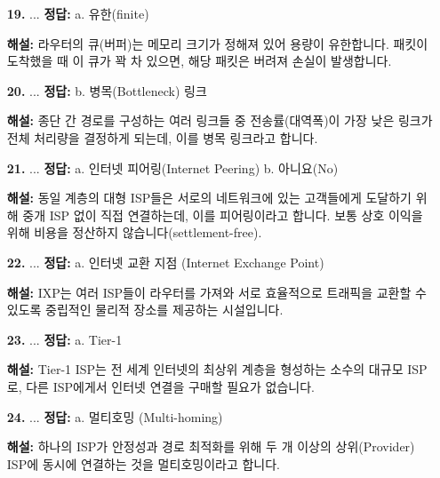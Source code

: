 \documentclass[a4paper, 10pt]{article}
\newcommand{\sectionbox}[1]{
  \vspace{0.5em}
  \noindent\fbox{\textbf{#1}}
  \vspace{0.5em}
}
\begin{document}
\begin{enumerate}[itemsep=2.5em, leftmargin=2em, label={}]
\item[\textbf{19.}] ...
\vspace{0.5em}
\noindent\textbf{정답:} a. 유한(finite) \par
\small\textbf{해설:} 라우터의 큐(버퍼)는 메모리 크기가 정해져 있어 용량이 유한합니다. 패킷이 도착했을 때 이 큐가 꽉 차 있으면, 해당 패킷은 버려져 손실이 발생합니다.

\item[\textbf{20.}] ...
\vspace{0.5em}
\noindent\textbf{정답:} b. 병목(Bottleneck) 링크 \par
\small\textbf{해설:} 종단 간 경로를 구성하는 여러 링크들 중 전송률(대역폭)이 가장 낮은 링크가 전체 처리량을 결정하게 되는데, 이를 병목 링크라고 합니다.

\item[] \sectionbox{V. 인터넷 구조 및 계층 (5문제)}

\item[\textbf{21.}] ...
\vspace{0.5em}
\noindent\textbf{정답:} a. 인터넷 피어링(Internet Peering) b. 아니요(No) \par
\small\textbf{해설:} 동일 계층의 대형 ISP들은 서로의 네트워크에 있는 고객들에게 도달하기 위해 중개 ISP 없이 직접 연결하는데, 이를 피어링이라고 합니다. 보통 상호 이익을 위해 비용을 정산하지 않습니다(settlement-free).

\item[\textbf{22.}] ...
\vspace{0.5em}
\noindent\textbf{정답:} a. 인터넷 교환 지점 (Internet Exchange Point) \par
\small\textbf{해설:} IXP는 여러 ISP들이 라우터를 가져와 서로 효율적으로 트래픽을 교환할 수 있도록 중립적인 물리적 장소를 제공하는 시설입니다.

\item[\textbf{23.}] ...
\vspace{0.5em}
\noindent\textbf{정답:} a. Tier-1 \par
\small\textbf{해설:} Tier-1 ISP는 전 세계 인터넷의 최상위 계층을 형성하는 소수의 대규모 ISP로, 다른 ISP에게서 인터넷 연결을 구매할 필요가 없습니다.

\item[\textbf{24.}] ...
\vspace{0.5em}
\noindent\textbf{정답:} a. 멀티호밍 (Multi-homing) \par
\small\textbf{해설:} 하나의 ISP가 안정성과 경로 최적화를 위해 두 개 이상의 상위(Provider) ISP에 동시에 연결하는 것을 멀티호밍이라고 합니다.


\end{enumerate}
\end{document}
